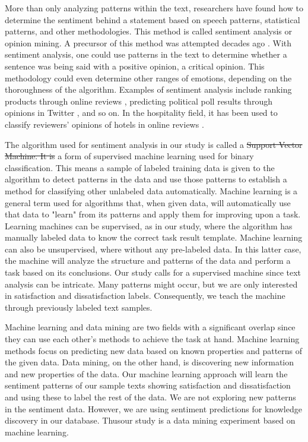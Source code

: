 \documentclass[smallextended,natbib]{svjour3}       %
\providecommand{\DIFadd}[1]{{\protect\color{blue}\uwave{#1}}} %
\providecommand{\DIFdel}[1]{{\protect\color{red}\sout{#1}}}                      %
\providecommand{\DIFaddbegin}{} %
\providecommand{\DIFaddend}{} %
\providecommand{\DIFdelbegin}{} %
\providecommand{\DIFdelend}{} %
\newcommand{\DIFscaledelfig}{0.5}
\newlength{\DIFdelgraphicswidth} %
\newlength{\DIFdelgraphicsheight} %
\newcommand{\DIFaddincludegraphics}[2][]{{\color{blue}\fbox{\DIFOincludegraphics[#1]{#2}}}} %
\newcommand{\DIFdelincludegraphics}[2][]{%
\sbox{\DIFdelgraphicsbox}{\DIFOincludegraphics[#1]{#2}}%
\settoboxwidth{\DIFdelgraphicswidth}{\DIFdelgraphicsbox} %
\settoboxtotalheight{\DIFdelgraphicsheight}{\DIFdelgraphicsbox} %
\scalebox{\DIFscaledelfig}{%
\parbox[b]{\DIFdelgraphicswidth}{\usebox{\DIFdelgraphicsbox}\\[-\baselineskip] \rule{\DIFdelgraphicswidth}{0em}}\llap{\resizebox{\DIFdelgraphicswidth}{\DIFdelgraphicsheight}{%
\setlength{\unitlength}{\DIFdelgraphicswidth}%
\begin{picture}(1,1)%
\thicklines\linethickness{2pt} %
{\color[rgb]{1,0,0}\put(0,0){\framebox(1,1){}}}%
{\color[rgb]{1,0,0}\put(0,0){\line( 1,1){1}}}%
{\color[rgb]{1,0,0}\put(0,1){\line(1,-1){1}}}%
\end{picture}%
}\hspace*{3pt}}} %
} %
\DeclareRobustCommand{\DIFaddbegin}{\DIFOaddbegin \let\includegraphics\DIFaddincludegraphics} %
\DeclareRobustCommand{\DIFaddend}{\DIFOaddend \let\includegraphics\DIFOincludegraphics} %
\DeclareRobustCommand{\DIFdelbegin}{\DIFOdelbegin \let\includegraphics\DIFdelincludegraphics} %
\DeclareRobustCommand{\DIFdelend}{\DIFOaddend \let\includegraphics\DIFOincludegraphics} %
\begin{document}
    More than only analyzing patterns within the text, researchers have found how to determine the sentiment behind a statement based on speech patterns, statistical patterns, and other methodologies. This method is called sentiment analysis or opinion mining. A precursor of this method was attempted decades ago \cite[][]{stone1966general}. With sentiment analysis, one could use patterns in the text to determine whether a sentence was being said with a positive opinion, a critical opinion. This methodology could even determine other ranges of emotions, depending on the thoroughness of the algorithm. Examples of sentiment analysis include ranking products through online reviews \cite[e.g][]{liu2017149, zhang2011}, predicting political poll results through opinions in Twitter \cite[][]{oconnor2010}, and so on. In the hospitality field, it has been used to classify reviewers' opinions of hotels in online reviews \cite[e.g.][]{kim2017362, alsmadi2018}. 

    The algorithm used for sentiment analysis in our study is called a \DIFdelbegin \DIFdel{Support Vector Machine. It is }\DIFdelend \DIFaddbegin \DIFadd{support vector machine, }\DIFaddend a form of supervised machine learning used for binary classification. This means a sample of labeled training data is given to the algorithm to detect patterns in the data and use those patterns to establish a method for classifying other unlabeled data automatically. Machine learning is a general term used for algorithms that, when given data, will automatically use that data to "learn" from its patterns and apply them for improving upon a task. Learning machines can be supervised, as in our study, where the algorithm has manually labeled data to know the correct task result template. Machine learning can also be unsupervised, where without any pre-labeled data. In this latter case, the machine will analyze the structure and patterns of the data and perform a task based on its conclusions. Our study calls for a supervised machine since text analysis can be intricate. Many patterns might occur, but we are only interested in satisfaction and dissatisfaction labels. Consequently, we teach the machine through previously labeled text samples. 

    Machine learning and data mining are two fields with a significant overlap since they can use each other's methods to achieve the task at hand. Machine learning methods focus on predicting new data based on known properties and patterns of the given data. Data mining, on the other hand, is discovering new information and new properties of the data. Our machine learning approach will learn the sentiment patterns of our sample texts showing satisfaction and dissatisfaction and using these to label the rest of the data. We are not exploring new patterns in the sentiment data. However, we are using sentiment predictions for knowledge discovery in our database. Thus\DIFaddbegin \DIFadd{, }\DIFaddend our study is a data mining experiment based on machine learning.
\end{document}
